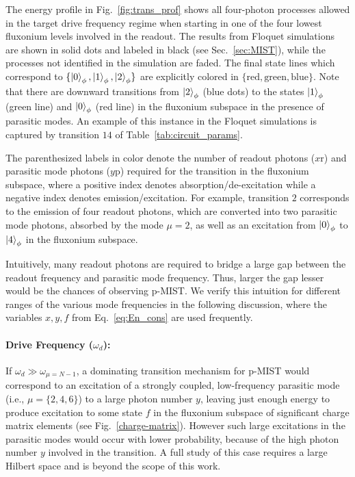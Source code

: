 \documentclass[%
reprint,
superscriptaddress,
 amsmath,amssymb,
 aps,
 prx,
longbibliography,
floatfix,
]{revtex4-2}
\begin{document}
The energy profile in Fig.~\ref{fig:trans_prof} shows all four-photon processes allowed in the target drive frequency regime when starting in one of the four lowest fluxonium levels involved in the readout. The results from Floquet simulations are  shown in solid dots and labeled in black (see Sec.~\ref{sec:MIST}), while the processes not identified in the simulation are faded. The final state lines which correspond to $\{\ket{0}_\phi,\ket{1}_\phi,\ket{2}_\phi\}$ are explicitly colored in $\{\mathrm{red},\mathrm{green},\mathrm{blue}\}$. Note that there are downward transitions from $\ket{2}_\phi$ (blue dots) to the states $\ket{1}_\phi$ (green line) and $\ket{0}_\phi$ (red line) in the fluxonium subspace in the presence of parasitic modes. An example of this instance in the Floquet simulations is captured by transition $14$ of Table~\ref{tab:circuit_params}. 

The parenthesized labels in color denote the number of readout photons ($x \mathrm{r}$) and parasitic mode photons ($y\mathrm{p}$) required for the transition in the fluxonium subspace, where a positive index denotes absorption/de-excitation while a negative index denotes emission/excitation. For example, transition $2$ corresponds to the emission of four readout photons, which are converted into two parasitic mode photons, absorbed by the mode $\mu=2$, as well as an excitation from $\ket{0}_\phi$ to $\ket{4}_\phi$ in the fluxonium subspace. 

Intuitively, many readout photons are required to bridge a large gap between the readout frequency and parasitic mode frequency. Thus, larger the gap lesser would be the chances of observing p-MIST. We verify this intuition for different ranges of the various mode frequencies in the following discussion, where the variables $x,y,f$ from Eq.~\ref{eq:En_cons} are used frequently.

\paragraph{Drive Frequency ($\omega_d$):} If $\omega_d\gg \omega_{\mu=N-1}$, a dominating transition mechanism for p-MIST would correspond to an excitation of a strongly coupled, low-frequency parasitic mode (i.e., $\mu=\{2,4,6\}$) to a large photon number $y$, leaving just enough energy to produce excitation to some state $f$ in the fluxonium subspace of significant charge matrix elements (see Fig.~\ref{charge-matrix}). However such large excitations in the parasitic modes would occur with lower probability, because of the high photon number $y$ involved in the transition. A full study of this case requires a large Hilbert space and is beyond the scope of this work. 
\end{document}

